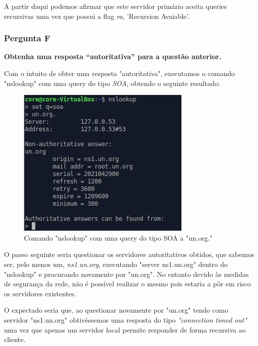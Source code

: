 \documentclass[11pt]{article}
\begin{document}
\par A partir daqui podemos afirmar que este servidor primário aceita queries recursivas uma vez que possui a flag \textit{ra}, 'Recursion Avaiable'.

\subsubsection{Pergunta F}

\textbf{Obtenha uma resposta “autoritativa” para a questão anterior.}

\par Com o intuito de obter uma resposta "autoritativa", executamos o comando "nslookup" com uma query do tipo \textit{SOA}, obtendo o seguinte resultado:

\begin{figure}[!htb]
    \centering
    \includegraphics[width=.5\textwidth]{images/Parte1/p1_f1.jpg}
    \caption{Comando "nslookup" com uma query do tipo SOA a "un.org."}
    \label{fig:unSOA}
\end{figure}

\par O passo seguinte seria questionar os servidores autoritativos obtidos, que sabemos ser, pelo menos um, \textit{ns1.un.org}, executando "server ns1.un.org" dentro do "nslookup" e procurando novamente por "un.org". No entanto devido às medidas de segurança da rede, não é possível realizar o mesmo pois estaria a pôr em risco os servidores existentes.

\par O expectado seria que, ao questionar novamente por "un.org" tendo como servidor "ns1.un.org" obtivéssemos uma resposta do tipo \textit{"connection timed out"} uma vez que apenas um servidor local permite responder de forma recursiva ao cliente.

\end{document}
